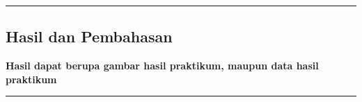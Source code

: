 {\color{gray}\hrule}
\begin{center}
\section{Hasil dan Pembahasan}
\textbf{Hasil dapat berupa gambar hasil praktikum, maupun data hasil praktikum}
\end{center}
{\color{gray}\hrule}
\begin{multicols}{2}
\lipsum[1-3]
\end{multicols}